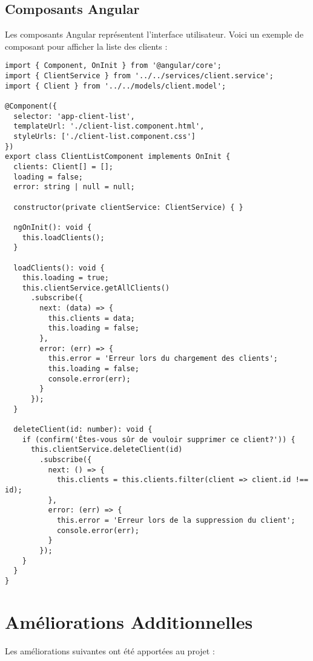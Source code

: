\subsection{Composants Angular}
Les composants Angular représentent l'interface utilisateur. Voici un exemple de composant pour afficher la liste des clients :

\begin{lstlisting}[caption=Composant Angular pour la liste des clients]
import { Component, OnInit } from '@angular/core';
import { ClientService } from '../../services/client.service';
import { Client } from '../../models/client.model';

@Component({
  selector: 'app-client-list',
  templateUrl: './client-list.component.html',
  styleUrls: ['./client-list.component.css']
})
export class ClientListComponent implements OnInit {
  clients: Client[] = [];
  loading = false;
  error: string | null = null;

  constructor(private clientService: ClientService) { }

  ngOnInit(): void {
    this.loadClients();
  }

  loadClients(): void {
    this.loading = true;
    this.clientService.getAllClients()
      .subscribe({
        next: (data) => {
          this.clients = data;
          this.loading = false;
        },
        error: (err) => {
          this.error = 'Erreur lors du chargement des clients';
          this.loading = false;
          console.error(err);
        }
      });
  }

  deleteClient(id: number): void {
    if (confirm('Êtes-vous sûr de vouloir supprimer ce client?')) {
      this.clientService.deleteClient(id)
        .subscribe({
          next: () => {
            this.clients = this.clients.filter(client => client.id !== id);
          },
          error: (err) => {
            this.error = 'Erreur lors de la suppression du client';
            console.error(err);
          }
        });
    }
  }
}
\end{lstlisting}

\section{Améliorations Additionnelles}
Les améliorations suivantes ont été apportées au projet :

